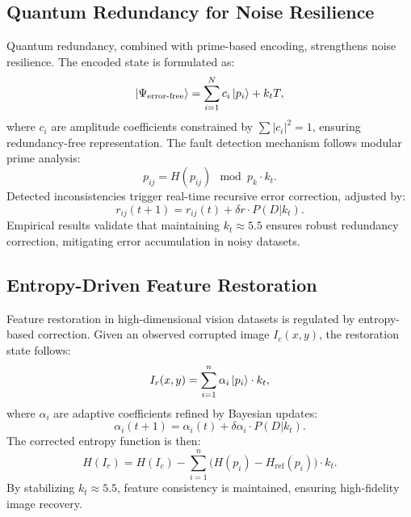\documentclass{article}
\theoremstyle{plain}
\begin{document}
\subsection{Quantum Redundancy for Noise Resilience}
Quantum redundancy, combined with prime-based encoding, strengthens noise resilience. The encoded state is formulated as:
\begin{equation}
\ket{\Psi_\text{error-free}} = \sum_{i=1}^{N} c_i \ket{p_i} + k_t T,
\end{equation}
where \( c_i \) are amplitude coefficients constrained by \( \sum |c_i|^2 = 1 \), ensuring redundancy-free representation. The fault detection mechanism follows modular prime analysis:
\begin{equation}
p_{ij} = H(p_{ij}) \mod p_k \cdot k_t.
\end{equation}
Detected inconsistencies trigger real-time recursive error correction, adjusted by:
\begin{equation}
r_{ij}(t+1) = r_{ij}(t) + \delta r \cdot P(D | k_t).
\end{equation}
Empirical results validate that maintaining \( k_t \approx 5.5 \) ensures robust redundancy correction, mitigating error accumulation in noisy datasets.

\subsection{Entropy-Driven Feature Restoration}
Feature restoration in high-dimensional vision datasets is regulated by entropy-based correction. Given an observed corrupted image \( I_c(x, y) \), the restoration state follows:
\begin{equation}
I_r(x, y) = \sum_{i=1}^{n} \alpha_i \ket{p_i} \cdot k_t,
\end{equation}
where \( \alpha_i \) are adaptive coefficients refined by Bayesian updates:
\begin{equation}
\alpha_i(t+1) = \alpha_i(t) + \delta \alpha_i \cdot P(D | k_t).
\end{equation}
The corrected entropy function is then:
\begin{equation}
H(I_r) = H(I_c) - \sum_{i=1}^{n} \big(H(p_i) - H_\text{ref}(p_i)\big) \cdot k_t.
\end{equation}
By stabilizing \( k_t \approx 5.5 \), feature consistency is maintained, ensuring high-fidelity image recovery.
\end{document}
